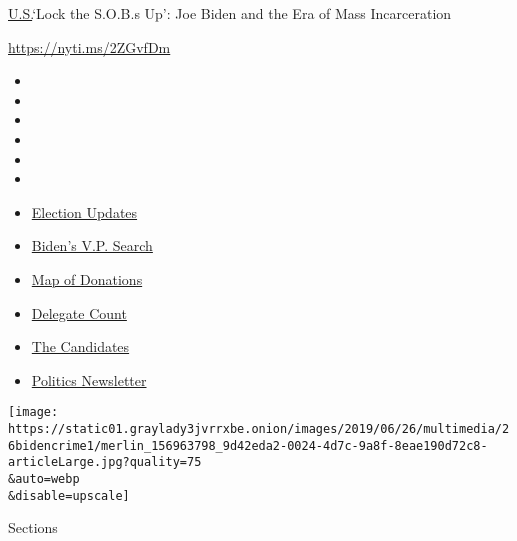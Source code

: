 \href{/section/us}{U.S.}\textbar{}`Lock the S.O.B.s Up': Joe Biden and
the Era of Mass Incarceration

\href{https://nyti.ms/2ZGvfDm}{https://nyti.ms/2ZGvfDm}

\begin{itemize}
\item
\item
\item
\item
\item
\item
\end{itemize}

\begin{itemize}
\item
  \href{https://www.nytimes3xbfgragh.onion/2020/08/04/us/elections/primary-election-michigan-arizona-kansas.html?action=click\&pgtype=Article\&state=default\&region=TOP_BANNER\&context=storylines_menu}{Election
  Updates}
\item
  \href{https://www.nytimes3xbfgragh.onion/article/biden-vice-president-2020.html?action=click\&pgtype=Article\&state=default\&region=TOP_BANNER\&context=storylines_menu}{Biden's
  V.P. Search}
\item
  \href{https://www.nytimes3xbfgragh.onion/interactive/2020/07/24/us/politics/trump-biden-campaign-donors.html?action=click\&pgtype=Article\&state=default\&region=TOP_BANNER\&context=storylines_menu}{Map
  of Donations}
\item
  \href{https://www.nytimes3xbfgragh.onion/interactive/2020/us/elections/delegate-count-primary-results.html?action=click\&pgtype=Article\&state=default\&region=TOP_BANNER\&context=storylines_menu}{Delegate
  Count}
\item
  \href{https://www.nytimes3xbfgragh.onion/interactive/2019/us/politics/2020-presidential-candidates.html?action=click\&pgtype=Article\&state=default\&region=TOP_BANNER\&context=storylines_menu}{The
  Candidates}
\item
  \href{https://www.nytimes3xbfgragh.onion/newsletters/politics?action=click\&pgtype=Article\&state=default\&region=TOP_BANNER\&context=storylines_menu}{Politics
  Newsletter}
\end{itemize}

\texttt{[image: https://static01.graylady3jvrrxbe.onion/images/2019/06/26/multimedia/26bidencrime1/merlin\_156963798\_9d42eda2-0024-4d7c-9a8f-8eae190d72c8-articleLarge.jpg?quality=75\\\&auto=webp\\\&disable=upscale]}

Sections

